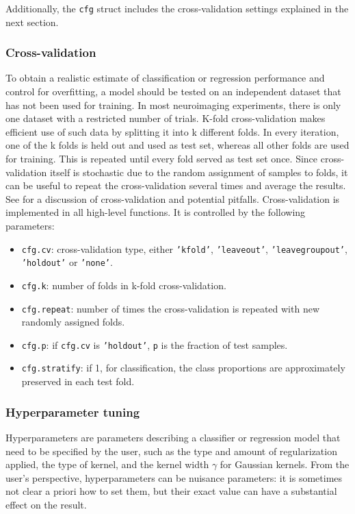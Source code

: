 \documentclass[utf8]{frontiersSCNS} %
\newcommand{\ttt}[1]{\texttt{#1}}
\begin{document}
Additionally, the \ttt{cfg} struct includes the cross-validation settings explained in the next section.


\subsubsection{Cross-validation}

To obtain a realistic estimate of classification or regression performance and control for overfitting, a model should be tested on an independent dataset that has not been used for training. In most neuroimaging experiments, there is only one dataset with a restricted number of trials. K-fold cross-validation makes efficient use of such data by splitting it into k different folds. In every iteration, one of the k folds is held out and used as test set, whereas all other folds are used for training. This is repeated until every fold served as test set once. Since cross-validation itself is stochastic due to the random assignment of samples to folds, it can be useful to repeat the cross-validation several times and average the results. See \cite{Lemm2011,Varoquaux2017} for a discussion of cross-validation and potential pitfalls. Cross-validation is implemented in all high-level functions. It is controlled by the following parameters:

\begin{itemize}
    \item \ttt{cfg.cv}: cross-validation type, either \ttt{'kfold'}, \ttt{'leaveout'}, \ttt{'leavegroupout'}, \ttt{'holdout'} or \ttt{'none'}.
    \item \ttt{cfg.k}: number of folds in k-fold cross-validation.
    \item \ttt{cfg.repeat}: number of times the cross-validation is repeated with new randomly assigned folds.
    \item \ttt{cfg.p}: if \ttt{cfg.cv} is \ttt{'holdout'}, \ttt{p} is the fraction of test samples.
    \item \ttt{cfg.stratify}: if 1, for classification, the class proportions are approximately preserved in each test fold.
\end{itemize}

\subsubsection{Hyperparameter tuning}

Hyperparameters are parameters describing a classifier or regression model that need to be specified by the user, such as the type and amount of regularization applied, the type of kernel, and the kernel width $\gamma$ for Gaussian kernels. From the user's perspective, hyperparameters can be nuisance parameters: it is sometimes not clear a priori how to set them, but their exact value can have a substantial effect on the result.
\end{document}
